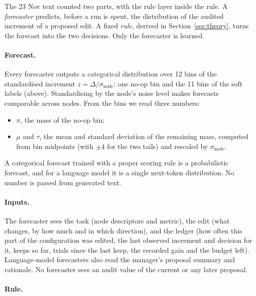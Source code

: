 The 23 Nov text counted two parts, with the rule layer inside the rule. A \emph{forecaster} predicts, before a run is spent, the distribution of the audited increment of a proposed edit. A fixed \emph{rule}, derived in Section~\ref{sec:theory}, turns the forecast into the two decisions. Only the forecaster is learned.

\paragraph{Forecast.}

Every forecaster outputs a categorical distribution over 12 bins of the standardised increment $z=\Delta/\sigma_{\mathrm{node}}$: one no-op bin and the 11 bins of the soft labels (above). Standardising by the node's noise level makes forecasts comparable across nodes. From the bins we read three numbers:
\begin{itemize}
\item $\pi$, the mass of the no-op bin;
\item $\mu$ and $\tau$, the mean and standard deviation of the remaining mass, computed from bin midpoints (with $\pm4$ for the two tails) and rescaled by $\sigma_{\mathrm{node}}$.
\end{itemize}
A categorical forecast trained with a proper scoring rule is a probabilistic forecast, and for a language model it is a single next-token distribution. No number is parsed from generated text.

\paragraph{Inputs.}
The forecaster sees the task (node descriptors and metric), the edit (what changes, by how much and in which direction), and the ledger (how often this part of the configuration was edited, the last observed increment and decision for it, keeps so far, trials since the last keep, the recorded gain and the budget left). Language-model forecasters also read the manager's proposal summary and rationale. No forecaster sees an audit value of the current or any later proposal.

\paragraph{Rule.}

